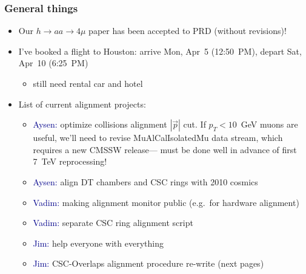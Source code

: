 \documentclass[compress]{beamer}
\begin{document}

\small


\begin{frame}
\frametitle{General things}
\begin{itemize}
\item Our $h \to aa \to 4\mu$ paper has been accepted to PRD (without revisions)!

\item I've booked a flight to Houston: arrive Mon, Apr~5 (12:50~PM), depart Sat, Apr~10 (6:25~PM)
\begin{itemize}
\item still need rental car and hotel
\end{itemize}

\item List of current alignment projects:
\begin{itemize}\setlength{\itemsep}{0.1 cm}
\item \textcolor{darkblue}{Aysen:} optimize collisions alignment $|\vec{p}|$ cut.  If $p_T <
  10$~GeV muons are useful, we'll need to revise MuAlCalIsolatedMu
  data stream, which requires a new CMSSW release--- must be done well
  in advance of first 7~TeV reprocessing!
\item \textcolor{darkblue}{Aysen:} align DT chambers and CSC rings with 2010 cosmics
\item \textcolor{darkblue}{Vadim:} making alignment monitor public (e.g.\ for hardware alignment)
\item \textcolor{darkblue}{Vadim:} separate CSC ring alignment script
\item \textcolor{darkblue}{Jim:} help everyone with everything
\item \textcolor{darkblue}{Jim:} CSC-Overlaps alignment procedure re-write (next pages)
\end{itemize}

\end{itemize}
\end{frame}
\end{document}

